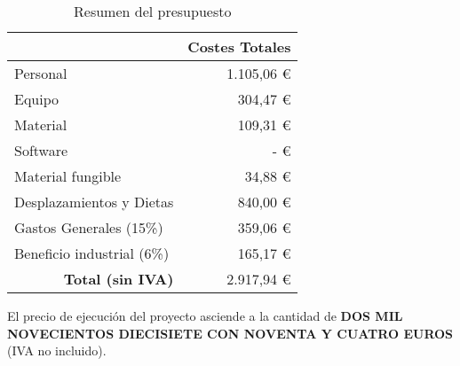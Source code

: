 \begin{table}[H]
	\centering
	\caption{Resumen del presupuesto}
	\label{tab:presupuesto_total}
	\begin{tabular}{l|r|}
		\hline
		\rowcolor[HTML]{BFBFBF}
		\multicolumn{1}{|c|}{\cellcolor[HTML]{BFBFBF}\textbf{Presupuestos}} & \multicolumn{1}{c|}{\cellcolor[HTML]{BFBFBF}\textbf{Costes Totales}} \\ \hline
		\multicolumn{1}{|l|}{Personal}                                      & 1.105,06 €                                                           \\ \hline
		\multicolumn{1}{|l|}{Equipo}                                        & 304,47 €                                                             \\ \hline
		\multicolumn{1}{|l|}{Material}                                      & 109,31 €                                                             \\ \hline
		\multicolumn{1}{|l|}{Software}                                      & -   €                                                                \\ \hline
		\multicolumn{1}{|l|}{Material fungible}                             & 34,88 €                                                              \\ \hline
		\multicolumn{1}{|l|}{Desplazamientos y Dietas}                      & 840,00 €                                                             \\ \hline
		\multicolumn{1}{|l|}{Gastos Generales (15\%)}                       & 359,06 €                                                             \\ \hline
		\multicolumn{1}{|l|}{Beneficio industrial (6\%)}                    & 165,17 €                                                             \\ \hline
		\multicolumn{1}{r|}{\textbf{Total (sin IVA)}}                       & 2.917,94 €                                                           \\ \cline{2-2}
	\end{tabular}
\end{table}

\noindent
El precio de ejecución del proyecto asciende a la cantidad de \textbf{DOS MIL NOVECIENTOS DIECISIETE CON NOVENTA Y CUATRO EUROS} (IVA no incluido).